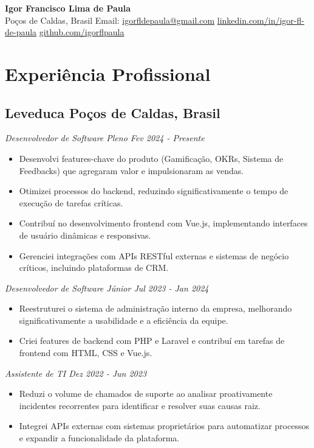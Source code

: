 \documentclass[a4paper,10pt]{article}
\begin{document}
\begin{center}
    {\LARGE \textbf{Igor Francisco Lima de Paula}} \\ [0.1cm]
    Poços de Caldas, Brasil {\textbullet}
    Email: \href{mailto:igorfldepaula@gmail.com}{igorfldepaula@gmail.com} {\textbullet}
    \href{https://www.linkedin.com/in/igor-fl-de-paula}{linkedin.com/in/igor-fl-de-paula} {\textbullet}
    \href{https://github.com/igorflpaula}{github.com/igorflpaula}
\end{center}

\section{Experiência Profissional}
    \subsection*{\texorpdfstring{
        \textbf{Leveduca} \hfill Poços de Caldas, Brasil
        }{
            Leveduca -- Poços de Caldas, Brasil
        }}
    \textit{Desenvolvedor de Software Pleno \hfill Fev 2024 - Presente}
        \begin{itemize} 
            \item Desenvolvi features-chave do produto (Gamificação, OKRs, Sistema de Feedbacks) que agregaram valor e impulsionaram as vendas.
            \item Otimizei processos do backend, reduzindo significativamente o tempo de execução de tarefas críticas.
            \item Contribuí no desenvolvimento frontend com Vue.js, implementando interfaces de usuário dinâmicas e responsivas.
            \item Gerenciei integrações com APIs RESTful externas e sistemas de negócio críticos, incluindo plataformas de CRM.
        \end{itemize}
    \textit{Desenvolvedor de Software Júnior \hfill Jul 2023 - Jan 2024}
        \begin{itemize} 
            \item Reestruturei o sistema de administração interno da empresa, melhorando significativamente a usabilidade e a eficiência da equipe.
            \item Criei features de backend com PHP e Laravel e contribuí em tarefas de frontend com HTML, CSS e Vue.js.
        \end{itemize}
    \textit{Assistente de TI \hfill Dez 2022 - Jun 2023}
        \begin{itemize} 
            \item Reduzi o volume de chamados de suporte ao analisar proativamente incidentes recorrentes para identificar e resolver suas causas raiz.
            \item Integrei APIs externas com sistemas proprietários para automatizar processos e expandir a funcionalidade da plataforma.
        \end{itemize}
        
\end{document}
